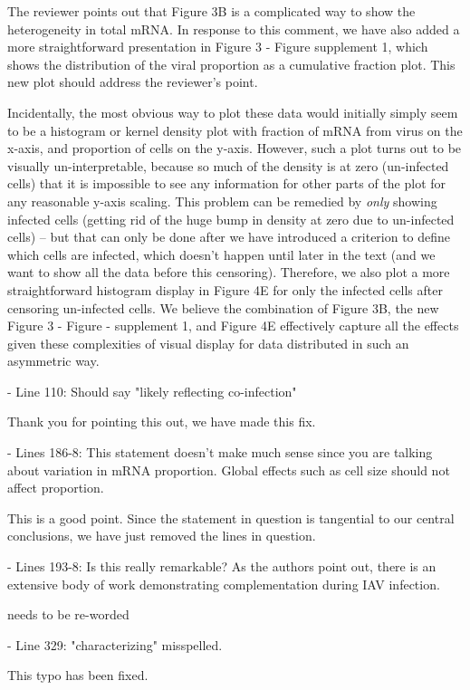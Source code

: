 \documentclass[11pt, oneside]{article}   	%
\begin{document}
{\color{black}
The reviewer points out that Figure 3B is a complicated way to show the heterogeneity in total mRNA.
In response to this comment, we have also added a more straightforward presentation in Figure 3 - Figure supplement 1, which shows the distribution of the viral proportion as a cumulative fraction plot.
This new plot should address the reviewer's point.

Incidentally, the most obvious way to plot these data would initially simply seem to be a histogram or kernel density plot with fraction of mRNA from virus on the x-axis, and proportion of cells on the y-axis.
However, such a plot turns out to be visually un-interpretable, because so much of the density is at zero (un-infected cells) that it is impossible to see any information for other parts of the plot for any reasonable y-axis scaling. 
This problem can be remedied by \emph{only} showing infected cells (getting rid of the huge bump in density at zero due to un-infected cells) -- but that can only be done after we have introduced a criterion to define which cells are infected, which doesn't happen until later in the text (and we want to show all the data before this censoring).
Therefore, we also plot a more straightforward histogram display in Figure 4E for only the infected cells after censoring un-infected cells.
We believe the combination of Figure 3B, the new Figure 3 - Figure - supplement 1, and Figure 4E effectively capture all the effects given these complexities of visual display for data distributed in such an asymmetric way.
}

- Line 110: Should say "likely reflecting co-infection" 

{\color{black}
Thank you for pointing this out, we have made this fix.}

- Lines 186-8: This statement doesn't make much sense since you are talking about variation in mRNA proportion. Global effects such as cell size should not affect proportion. 

{\color{black}
This is a good point. 
Since the statement in question is tangential to our central conclusions, we have just removed the lines in question.
}

- Lines 193-8: Is this really remarkable? As the authors point out, there is an extensive body of work demonstrating complementation during IAV infection. 

{\color{red} needs to be re-worded}

- Line 329: "characterizing" misspelled. 

{\color{black}
This typo has been fixed.
}
\end{document}

